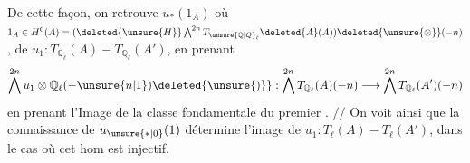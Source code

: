 De cette façon, on retrouve $u_*(1_A)$ où $1_A\in H^0(A)=(\deleted{\unsure{H}}\bigwedge^{2n}T_{\unsure{\mathbb Q|Q}_\ell}\deleted{A}(A))\deleted{\unsure{\otimes}}(-n)$,  de $u_1:T_{\mathbb Q_\ell}(A)\mathrel{-}T_{\mathbb Q_\ell}(A')$, en prenant
\[
 \bigwedge^{2n}u_1\otimes\mathbb Q_\ell(-\unsure{n|1})\deleted{\unsure{)}}:
 \bigwedge^{2n}T_{\mathbb Q_\ell}(A)(-n)\longrightarrow\bigwedge^{2n}T_{\mathbb Q_\ell}(A')(-n)
\]
en prenant l'Image de la classe fondamentale du premier . \(/\!/\) On voit ainsi
que  la connaissance de $u_{\unsure{*|0}}(1)$ détermine l'image de $u_1:T_\ell(A)\mathrel{-}T_\ell(A')$, dans le cas où cet hom est injectif.

